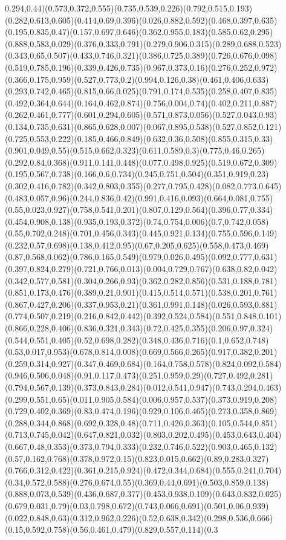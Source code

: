 {0.294,0.44)(0.573,0.372,0.555)(0.735,0.539,0.226)(0.792,0.515,0.193)(0.282,0.613,0.605)(0.414,0.69,0.396)(0.026,0.882,0.592)(0.468,0.397,0.635)(0.195,0.835,0.47)(0.157,0.697,0.646)(0.362,0.955,0.183)(0.585,0.62,0.295)(0.888,0.583,0.029)(0.376,0.333,0.791)(0.279,0.906,0.315)(0.289,0.688,0.523)(0.343,0.65,0.507)(0.433,0.746,0.321)(0.386,0.725,0.389)(0.726,0.676,0.098)(0.519,0.785,0.196)(0.339,0.426,0.735)(0.967,0.373,0.16)(0.276,0.252,0.972)(0.366,0.175,0.959)(0.527,0.773,0.2)(0.994,0.126,0.38)(0.461,0.406,0.633)(0.293,0.742,0.465)(0.815,0.66,0.025)(0.791,0.174,0.535)(0.258,0.407,0.835)(0.492,0.364,0.644)(0.164,0.462,0.874)(0.756,0.004,0.74)(0.402,0.211,0.887)(0.262,0.461,0.777)(0.601,0.294,0.605)(0.571,0.873,0.056)(0.527,0.043,0.93)(0.134,0.735,0.631)(0.865,0.628,0.007)(0.067,0.895,0.538)(0.527,0.852,0.121)(0.725,0.553,0.222)(0.185,0.466,0.849)(0.632,0.36,0.508)(0.855,0.315,0.33)(0.901,0.049,0.55)(0.515,0.662,0.323)(0.611,0.589,0.3)(0.775,0.46,0.265)(0.292,0.84,0.368)(0.911,0.141,0.448)(0.077,0.498,0.925)(0.519,0.672,0.309)(0.195,0.567,0.738)(0.166,0.6,0.734)(0.245,0.751,0.504)(0.351,0.919,0.23)(0.302,0.416,0.782)(0.342,0.803,0.355)(0.277,0.795,0.428)(0.082,0.773,0.645)(0.483,0.057,0.96)(0.244,0.836,0.42)(0.991,0.416,0.093)(0.664,0.081,0.755)(0.55,0.023,0.927)(0.758,0.541,0.201)(0.807,0.129,0.564)(0.396,0.77,0.334)(0.454,0.908,0.138)(0.935,0.193,0.372)(0.74,0.754,0.006)(0.7,0.742,0.058)(0.55,0.702,0.248)(0.701,0.456,0.343)(0.445,0.921,0.134)(0.755,0.596,0.149)(0.232,0.57,0.698)(0.138,0.412,0.95)(0.67,0.205,0.625)(0.558,0.473,0.469)(0.87,0.568,0.062)(0.786,0.165,0.549)(0.979,0.026,0.495)(0.092,0.777,0.631)(0.397,0.824,0.279)(0.721,0.766,0.013)(0.004,0.729,0.767)(0.638,0.82,0.042)(0.342,0.577,0.581)(0.304,0.266,0.93)(0.362,0.282,0.856)(0.531,0.188,0.781)(0.851,0.173,0.476)(0.389,0.21,0.901)(0.415,0.514,0.571)(0.538,0.201,0.761)(0.867,0.427,0.206)(0.337,0.953,0.21)(0.361,0.991,0.148)(0.026,0.593,0.881)(0.774,0.507,0.219)(0.216,0.842,0.442)(0.392,0.524,0.584)(0.551,0.848,0.101)(0.866,0.228,0.406)(0.836,0.321,0.343)(0.72,0.425,0.355)(0.206,0.97,0.324)(0.544,0.551,0.405)(0.52,0.698,0.282)(0.348,0.436,0.716)(0.1,0.652,0.748)(0.53,0.017,0.953)(0.678,0.814,0.008)(0.669,0.566,0.265)(0.917,0.382,0.201)(0.259,0.314,0.927)(0.347,0.469,0.684)(0.164,0.758,0.578)(0.824,0.092,0.584)(0.946,0.506,0.048)(0.91,0.117,0.473)(0.251,0.959,0.29)(0.727,0.492,0.281)(0.794,0.567,0.139)(0.373,0.843,0.284)(0.012,0.541,0.947)(0.743,0.294,0.463)(0.299,0.551,0.65)(0.011,0.905,0.584)(0.006,0.957,0.537)(0.373,0.919,0.208)(0.729,0.402,0.369)(0.83,0.474,0.196)(0.929,0.106,0.465)(0.273,0.358,0.869)(0.288,0.344,0.868)(0.692,0.328,0.48)(0.711,0.426,0.363)(0.105,0.544,0.851)(0.713,0.745,0.042)(0.647,0.821,0.032)(0.803,0.202,0.495)(0.453,0.643,0.404)(0.667,0.48,0.353)(0.373,0.794,0.333)(0.232,0.746,0.522)(0.903,0.465,0.132)(0.57,0.162,0.768)(0.378,0.972,0.15)(0.823,0.015,0.662)(0.89,0.283,0.327)(0.766,0.312,0.422)(0.361,0.215,0.924)(0.472,0.344,0.684)(0.555,0.241,0.704)(0.34,0.572,0.588)(0.276,0.674,0.55)(0.369,0.44,0.691)(0.503,0.859,0.138)(0.888,0.073,0.539)(0.436,0.687,0.377)(0.453,0.938,0.109)(0.643,0.832,0.025)(0.679,0.031,0.79)(0.03,0.798,0.672)(0.743,0.066,0.691)(0.501,0.06,0.939)(0.022,0.848,0.63)(0.312,0.962,0.226)(0.52,0.638,0.342)(0.298,0.536,0.666)(0.15,0.592,0.758)(0.56,0.461,0.479)(0.829,0.557,0.114)(0.3}
